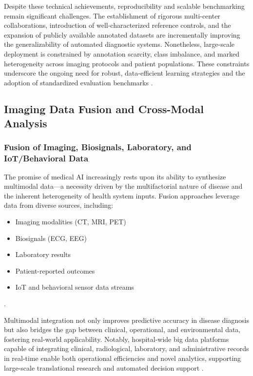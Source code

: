 \documentclass[sigconf]{acmart}
\begin{document}
Despite these technical achievements, reproducibility and scalable benchmarking remain significant challenges. The establishment of rigorous multi-center collaborations, introduction of well-characterized reference controls, and the expansion of publicly available annotated datasets are incrementally improving the generalizability of automated diagnostic systems. Nonetheless, large-scale deployment is constrained by annotation scarcity, class imbalance, and marked heterogeneity across imaging protocols and patient populations. These constraints underscore the ongoing need for robust, data-efficient learning strategies and the adoption of standardized evaluation benchmarks \cite{ref94}.

\subsection{Imaging Data Fusion and Cross-Modal Analysis}

\subsubsection{Fusion of Imaging, Biosignals, Laboratory, and IoT/Behavioral Data}

The promise of medical AI increasingly rests upon its ability to synthesize multimodal data—a necessity driven by the multifactorial nature of disease and the inherent heterogeneity of health system inputs. Fusion approaches leverage data from diverse sources, including:
\begin{itemize}
    \item Imaging modalities (CT, MRI, PET)
    \item Biosignals (ECG, EEG)
    \item Laboratory results
    \item Patient-reported outcomes
    \item IoT and behavioral sensor data streams
\end{itemize}
\cite{ref46,ref53,ref67,ref71}. 

Multimodal integration not only improves predictive accuracy in disease diagnosis but also bridges the gap between clinical, operational, and environmental data, fostering real-world applicability. Notably, hospital-wide big data platforms capable of integrating clinical, radiological, laboratory, and administrative records in real-time enable both operational efficiencies and novel analytics, supporting large-scale translational research and automated decision support \cite{ref106}.
\end{document}
